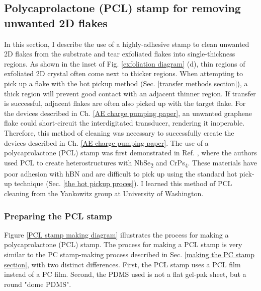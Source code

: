\documentclass[double,12pt,1in]{beavtex}
\begin{document}
\subsection{Polycaprolactone (PCL) stamp for removing unwanted 2D flakes}
In this section, I describe the use of a highly-adhesive stamp to clean unwanted 2D flakes from the substrate and tear exfoliated flakes into single-thickness regions. As shown in the inset of Fig. \ref{exfoliation diagram} (d), thin regions of exfoliated 2D crystal often come next to thicker regions. When attempting to pick up a flake with the hot pickup method (Sec. \ref{transfer methods section}), a thick region will prevent good contact with an adjacent thinner region. If transfer is successful, adjacent flakes are often also picked up with the target flake. For the devices described in Ch. \ref{AE charge pumping paper}, an unwanted graphene flake could short-circuit the interdigitated transducer, rendering it inoperable. Therefore, this method of cleaning was necessary to successfully create the devices described in Ch. \ref{AE charge pumping paper}. The use of a polycaprolactone (PCL) stamp was first demonstrated in Ref. \cite{son_strongly_2020}, where the authors used PCL to create heterostructures with NbSe\textsubscript{2} and CrPs\textsubscript{4}. These materials have poor adhesion with hBN and are difficult to pick up using the standard hot pick-up technique (Sec. \ref{the hot pickup proces}). I learned this method of PCL cleaning from the Yankowitz group at University of Washington.

\subsubsection{Preparing the PCL stamp}


Figure \ref{PCL stamp making diagram} illustrates the process for making a polycaprolactone (PCL) stamp. The process for making a PCL stamp is very similar to the PC stamp-making process described in Sec. \ref{making the PC stamp section}, with two distinct differences. First, the PCL stamp uses a PCL film instead of a PC film. Second, the PDMS used is not a flat gel-pak sheet, but a round "dome PDMS". 
\end{document}
